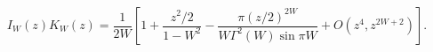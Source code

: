 \begin{equation}
\label{Eq_0405}
I_W(z) K_W(z) = \frac{1}{2W}
  \left[
  1 + \frac{z^2/2}{1-W^2}
  - \frac{\pi(z/2)^{2W}}{W\Gamma^2(W) \sin \pi W}
  + O(z^4, z^{2W+2})
  \right].
\end{equation}

